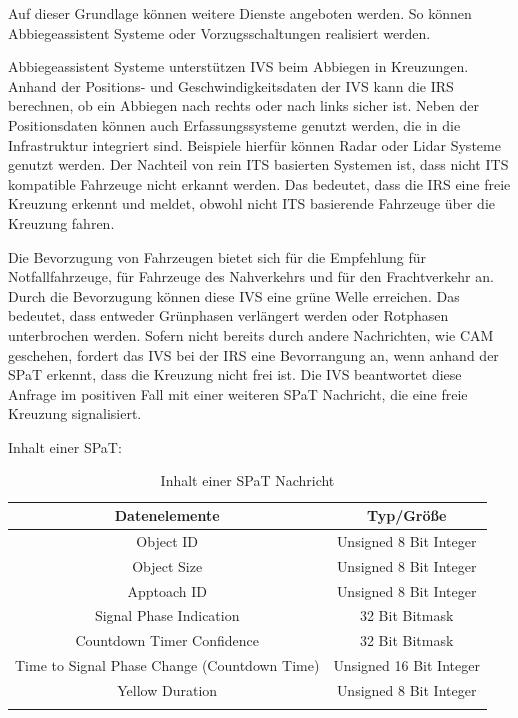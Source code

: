 Auf dieser Grundlage können weitere Dienste angeboten werden. So können Abbiegeassistent Systeme oder Vorzugsschaltungen realisiert werden. 

 Abbiegeassistent Systeme unterstützen \ac{IVS} beim Abbiegen in Kreuzungen. Anhand der Positions- und Geschwindigkeitsdaten der \ac{IVS} kann die \ac{IRS} berechnen, ob ein Abbiegen nach rechts oder nach links sicher ist. Neben der Positionsdaten können auch Erfassungssysteme genutzt werden, die in die Infrastruktur integriert sind. Beispiele hierfür können \ac{Radar} oder \ac{Lidar} Systeme genutzt werden. Der Nachteil von rein \ac{ITS} basierten Systemen ist, dass nicht \ac{ITS} kompatible Fahrzeuge nicht erkannt werden. Das bedeutet, dass die \ac{IRS} eine freie Kreuzung erkennt und meldet, obwohl nicht \ac{ITS} basierende Fahrzeuge über die Kreuzung fahren. 
 
Die Bevorzugung von Fahrzeugen bietet sich für die Empfehlung \cite{usSpat} für Notfallfahrzeuge, für Fahrzeuge des Nahverkehrs und für den Frachtverkehr an. Durch die Bevorzugung können diese \ac{IVS} eine grüne Welle erreichen. Das bedeutet, dass entweder Grünphasen verlängert werden oder Rotphasen unterbrochen werden. Sofern nicht bereits durch andere Nachrichten, wie \ac{CAM} geschehen, fordert das \ac{IVS} bei der \ac{IRS} eine Bevorrangung an, wenn anhand der \ac{SPaT} erkennt, dass die Kreuzung nicht frei ist. Die \ac{IVS} beantwortet diese Anfrage im positiven Fall mit einer weiteren \ac{SPaT} Nachricht, die eine freie Kreuzung signalisiert.   

Inhalt einer \ac{SPaT}:
\begin{longtable}{|c|c|}
 \hline
\textbf{Datenelemente} & \textbf{Typ/Größe}\\
 \hline
 \hline
Object ID & Unsigned 8 Bit Integer\\
 \hline
 Object Size& Unsigned 8 Bit Integer\\
 \hline
 Apptoach ID & Unsigned 8 Bit Integer\\
 \hline
 Signal Phase Indication &  32 Bit Bitmask \\
 \hline
 Countdown Timer Confidence & 32 Bit Bitmask \\
 \hline
 Time to Signal Phase Change (Countdown Time) & Unsigned 16 Bit Integer \\
 \hline
 Yellow Duration & Unsigned 8 Bit Integer\\
 \hline
 \caption{Inhalt einer SPaT Nachricht \cite{usSpat}}
 \label{tab:facilitylayer_inhaltSpatNachricht}
 \end{longtable}
 
